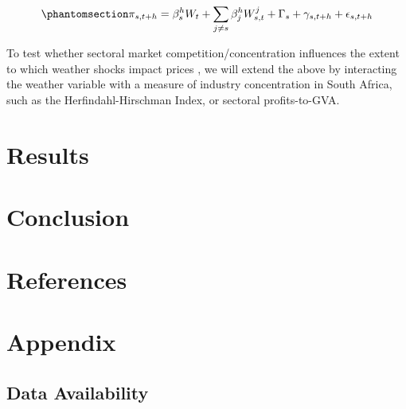\documentclass[
  letterpaper,
  DIV=11,
  numbers=noendperiod]{scrartcl}
\begin{document}
\begin{equation}\phantomsection\label{eq-sa_h_inflation}{
\pi_{s,t+h} = \beta_s^h W_t+ \sum_{j \neq s} \beta_j^h W_{s,t}^j + \Gamma_{s} + \gamma_{s,t+h} + \epsilon_{s,t+h}       
}\end{equation}

To test whether sectoral market competition/concentration influences the
extent to which weather shocks impact prices \citep{weber2023}, we will
extend the above by interacting the weather variable with a measure of
industry concentration in South Africa, such as the Herfindahl-Hirschman
Index, or sectoral profits-to-GVA.

\section{Results}\label{results}

\section{Conclusion}\label{conclusion}

\newpage

\section*{References}\label{references}

\renewcommand{\bibsection}{}


\setcounter{section}{0}
\renewcommand{\thesection}{\Alph{section}}

\setcounter{table}{0}
\renewcommand{\thetable}{A\arabic{table}}

\setcounter{figure}{0}
\renewcommand{\thefigure}{A\arabic{figure}}

\newpage

\section{Appendix}\label{appendix}

\subsection{Data Availability}\label{data-availability}
\end{document}
